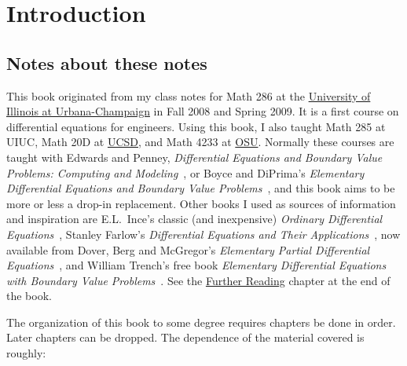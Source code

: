 \chapter*{Introduction} \label{intro:chapter}


\section{Notes about these notes}
\label{notes:section}

This book originated from my class notes for Math 286
at the \href{http://www.math.uiuc.edu/}{University of Illinois at
Urbana-Champaign}
in Fall 2008 and
Spring 2009.
It is a first course on differential equations for engineers.
Using this book, I also taught Math 285 at UIUC,
Math 20D at
\href{http://www.math.ucsd.edu/}{UCSD},
and Math 4233 at 
\href{http://www.math.okstate.edu/}{OSU}.
Normally these courses are taught with
Edwards and Penney, \emph{Differential
Equations and Boundary Value Problems: Computing and Modeling}~\cite{EP}, or
Boyce and DiPrima's
\emph{Elementary
Differential Equations and Boundary Value Problems}~\cite{BD},
and this book aims to be more or less a drop-in replacement.
Other books I used as sources of information and inspiration
are E.L.\ Ince's classic (and inexpensive)
\emph{Ordinary Differential Equations}~\cite{I},
Stanley Farlow's \emph{Differential Equations and Their
Applications}~\cite{F}, now available from Dover,
Berg and McGregor's
\emph{Elementary Partial Differential Equations}~\cite{BM},
and William Trench's free book
\emph{Elementary
Differential Equations with Boundary Value Problems}~\cite{T}.
See the \hyperref[furtherreading:chapter]{Further Reading} chapter at the end of the book.

The organization of this book to some degree
requires chapters be done in order.
Later chapters can be dropped.
The dependence of the material covered is roughly:

